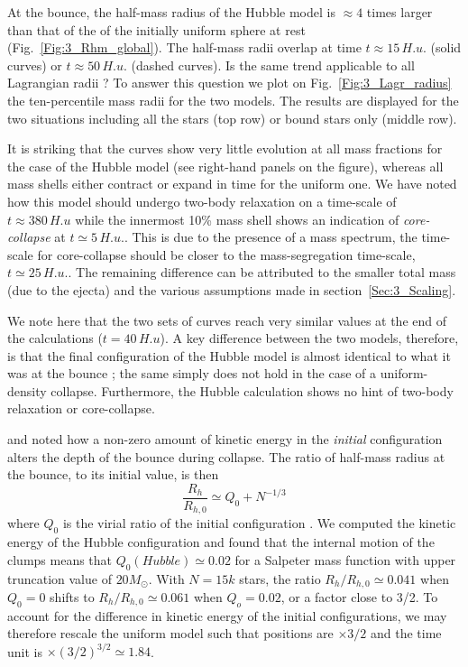 At the bounce, the half-mass radius of the Hubble model is $\approx 4$ times larger than that of the of the initially uniform sphere at rest (Fig.~\ref{Fig:3_Rhm_global}). The half-mass radii overlap at time $t \approx 15 \,H.u.$ (solid curves) or $t \approx 50 \,H.u.$ (dashed curves). Is the same trend applicable to all Lagrangian radii ? To answer this question we plot on Fig.~\ref{Fig:3_Lagr_radius} the ten-percentile mass radii for the two models. The results are displayed for the two situations including all the stars (top row) or bound stars only (middle row). 

It is striking that the curves show very little evolution at all mass fractions for the case of the Hubble model (see right-hand panels on the figure), whereas all mass shells either contract or expand in time for the uniform one. We have noted how this model should undergo two-body relaxation on a time-scale of $t \approx 380 \,H.u$ while the innermost 10\% mass shell shows an  indication of \textit{core-collapse} at $t \simeq 5 \,H.u.$. This is due to the presence of a mass spectrum, the time-scale for core-collapse should be closer to the mass-segregation time-scale,  $t \simeq 25 \,H.u.$. The remaining difference can be attributed to the smaller total mass (due to the ejecta) and the various assumptions made in section~\ref{Sec:3_Scaling}.

We note here that the two sets of curves reach very similar values at the end of the calculations ($t = 40\, H.u$). A key difference between the two models, therefore, is that the final configuration of the Hubble model is almost identical to what it was at the bounce ; the same simply does not hold in the case of a uniform-density collapse. Furthermore, the Hubble calculation shows no hint of two-body relaxation or core-collapse.

\cite{Caputo2014} and \cite{Theis1999} noted how a non-zero amount of kinetic energy in the {\it initial} configuration alters the  depth of the bounce during collapse. The ratio of half-mass radius at the bounce, to its initial value, is then
\begin{equation}
\frac{R_h}{R_{h,0}} \simeq Q_0 + N^{-1/3}
\end{equation} 
 where $Q_0$ is the virial ratio of the initial configuration \citep[see][Fig.5]{Caputo2014}. We computed the kinetic energy of the  Hubble configuration and found that the internal motion of the clumps means that $Q_0 (Hubble) \simeq 0.02$ for a Salpeter mass function with upper truncation value of $20 M_\odot$. With $N = 15k$ stars, the ratio $R_h/R_{h,0} \simeq 0.041$ when $Q_0 = 0$ shifts to $R_h/R_{h,0} \simeq 0.061$ when $Q_o = 0.02$, or a factor close to 3/2. To account for the difference in kinetic energy of the initial configurations, we may therefore rescale the uniform model such that positions are  $ \times 3/2$ and the time unit is $\times (3/2)^{3/2} \simeq 1.84$.
 
